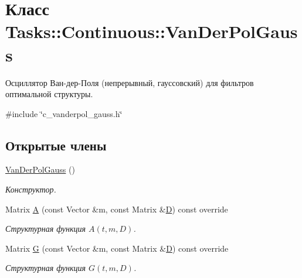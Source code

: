 \hypertarget{class_tasks_1_1_continuous_1_1_van_der_pol_gauss}{}\section{Класс Tasks\+:\+:Continuous\+:\+:Van\+Der\+Pol\+Gauss}
\label{class_tasks_1_1_continuous_1_1_van_der_pol_gauss}


Осциллятор Ван-\/дер-\/Поля (непрерывный, гауссовский) для фильтров оптимальной структуры.  




{\ttfamily \#include \char`\"{}c\+\_\+vanderpol\+\_\+gauss.\+h\char`\"{}}

\subsection*{Открытые члены}
\begin{DoxyCompactItemize}
\item 
\hypertarget{class_tasks_1_1_continuous_1_1_van_der_pol_gauss_ae40ae7f81419b9ca24403335e72d92d2}{}\label{class_tasks_1_1_continuous_1_1_van_der_pol_gauss_ae40ae7f81419b9ca24403335e72d92d2} 
\hyperlink{class_tasks_1_1_continuous_1_1_van_der_pol_gauss_ae40ae7f81419b9ca24403335e72d92d2}{Van\+Der\+Pol\+Gauss} ()
\begin{DoxyCompactList}\small\item\em Конструктор. \end{DoxyCompactList}\item 
Matrix \hyperlink{class_tasks_1_1_continuous_1_1_van_der_pol_gauss_a2ef625f7f8c590726c5b52e67622c172}{A} (const Vector \&m, const Matrix \&\hyperlink{class_tasks_1_1_continuous_1_1_van_der_pol_linear_a07e8842a175006f214238a9f71e5ebdf}{D}) const override
\begin{DoxyCompactList}\small\item\em Структурная функция $A(t, m, D)$. \end{DoxyCompactList}\item 
Matrix \hyperlink{class_tasks_1_1_continuous_1_1_van_der_pol_gauss_a1b61ca6de96df17b049bc7934a241e47}{G} (const Vector \&m, const Matrix \&\hyperlink{class_tasks_1_1_continuous_1_1_van_der_pol_linear_a07e8842a175006f214238a9f71e5ebdf}{D}) const override
\begin{DoxyCompactList}\small\item\em Структурная функция $G(t, m, D)$. \end{DoxyCompactList}\end{DoxyCompactItemize}

